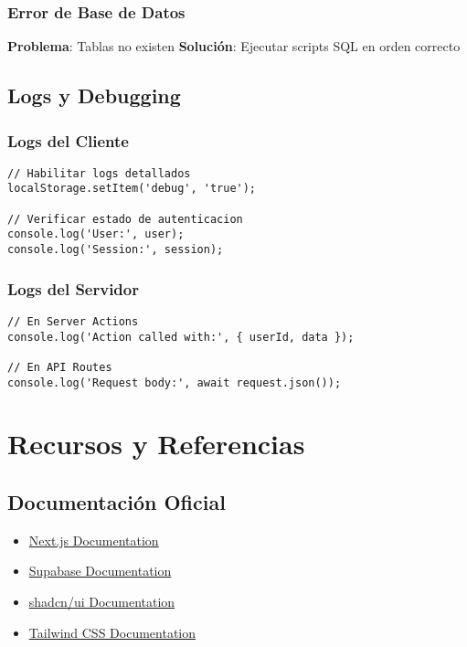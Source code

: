 \documentclass[12pt,a4paper]{article}
\begin{document}
\subsubsection{Error de Base de Datos}
\textbf{Problema}: Tablas no existen
\textbf{Solución}: Ejecutar scripts SQL en orden correcto

\subsection{Logs y Debugging}

\subsubsection{Logs del Cliente}
\begin{lstlisting}[caption=Debugging en cliente]
// Habilitar logs detallados
localStorage.setItem('debug', 'true');

// Verificar estado de autenticacion
console.log('User:', user);
console.log('Session:', session);
\end{lstlisting}

\subsubsection{Logs del Servidor}
\begin{lstlisting}[caption=Debugging en servidor]
// En Server Actions
console.log('Action called with:', { userId, data });

// En API Routes
console.log('Request body:', await request.json());
\end{lstlisting}

\section{Recursos y Referencias}

\subsection{Documentación Oficial}
\begin{itemize}
    \item \href{https://nextjs.org/docs}{Next.js Documentation}
    \item \href{https://supabase.com/docs}{Supabase Documentation}
    \item \href{https://ui.shadcn.com/}{shadcn/ui Documentation}
    \item \href{https://tailwindcss.com/docs}{Tailwind CSS Documentation}
\end{itemize}
\end{document}
